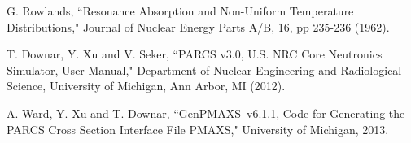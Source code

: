 \begin{thebibliography}{99}
G. Rowlands, ``Resonance Absorption and Non-Uniform Temperature Distributions," Journal of
Nuclear Energy Parts A/B, 16, pp 235-236 (1962).

T. Downar, Y. Xu and V. Seker, ``PARCS v3.0, U.S. NRC Core Neutronics Simulator, User Manual," Department of Nuclear Engineering and Radiological Science, University of Michigan, Ann Arbor, MI (2012).

A. Ward, Y. Xu and T. Downar, ``GenPMAXS--v6.1.1, Code for Generating the PARCS Cross Section Interface File PMAXS," University of Michigan, 2013.

\end{thebibliography}
